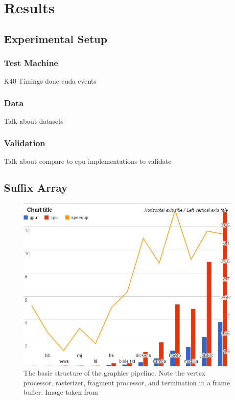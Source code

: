 \chapter{Results}

\section{Experimental Setup}
\subsection{Test Machine}
K40
Timings done cuda events

\subsection{Data}

Talk about datasets

\subsection{Validation}

Talk about compare to cpu implementations to validate

\section{Suffix Array}

\begin{figure}[ht!]
\centering
\includegraphics[width=1.0\textwidth]{images/chart2.png}
\caption{The basic structure of the graphics pipeline. Note the vertex processor, rasterizer, fragment processor, and termination in a frame buffer. Image taken from  \protect\cite{pipeline-image-ref}}
\label{fig:graphics-pipelinei2}
\end{figure}

